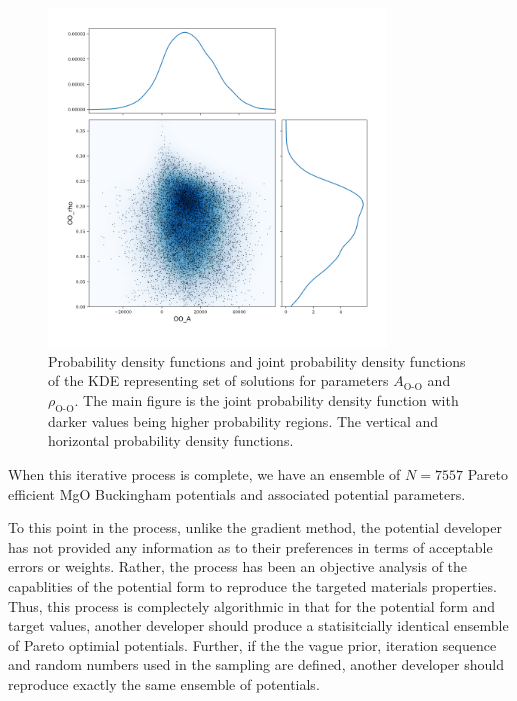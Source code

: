 \begin{figure}[ht]
	\centering
  \includegraphics[width=0.8\textwidth]{chapter7/MgO_biobjective_A_v_rho_OO}
  \caption{Probability density functions and joint probability density functions of the KDE representing set of solutions for parameters $A_{\text{O-O}}$ and $\rho_{\text{O-O}}$.  The main figure is the joint probability density function with darker values being higher probability regions.  The vertical and horizontal probability density functions.}
  \label{fig:MgO_biobjective_A_v_rho_OO}
\end{figure}

When this iterative process is complete, we have an ensemble of $N=7557$ Pareto efficient MgO Buckingham potentials and associated potential parameters.

To this point in the process, unlike the gradient method, the potential developer has not provided any information as to their preferences in terms of acceptable errors or weights. Rather, the process has been an objective analysis of the capablities of the potential form to reproduce the targeted materials properties.  Thus, this process is complectely algorithmic in that for the potential form and target values, another developer should produce a statisitcially identical ensemble of Pareto optimial potentials. Further, if the the vague prior, iteration sequence and random numbers used in the sampling are defined, another developer should reproduce exactly the same ensemble of potentials.

